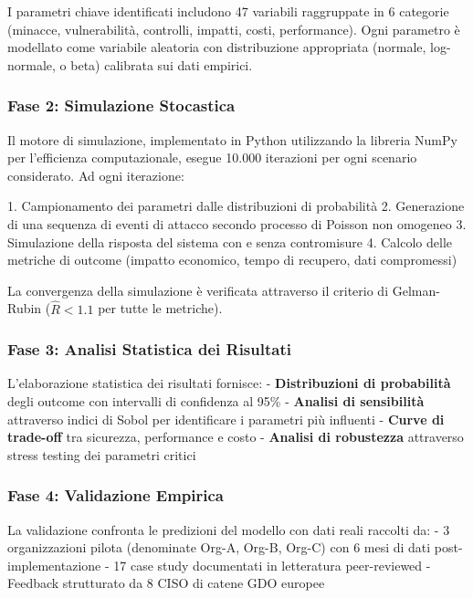 I parametri chiave identificati includono 47 variabili raggruppate in 6 categorie (minacce, vulnerabilità, controlli, impatti, costi, performance). Ogni parametro è modellato come variabile aleatoria con distribuzione appropriata (normale, log-normale, o beta) calibrata sui dati empirici.

\subsubsection{Fase 2: Simulazione Stocastica}

Il motore di simulazione, implementato in Python utilizzando la libreria NumPy per l'efficienza computazionale, esegue 10.000 iterazioni per ogni scenario considerato. Ad ogni iterazione:

1. Campionamento dei parametri dalle distribuzioni di probabilità
2. Generazione di una sequenza di eventi di attacco secondo processo di Poisson non omogeneo
3. Simulazione della risposta del sistema con e senza contromisure
4. Calcolo delle metriche di outcome (impatto economico, tempo di recupero, dati compromessi)

La convergenza della simulazione è verificata attraverso il criterio di Gelman-Rubin ($\hat{R} < 1.1$ per tutte le metriche).

\subsubsection{Fase 3: Analisi Statistica dei Risultati}

L'elaborazione statistica dei risultati fornisce:
- \textbf{Distribuzioni di probabilità} degli outcome con intervalli di confidenza al 95\%
- \textbf{Analisi di sensibilità} attraverso indici di Sobol per identificare i parametri più influenti
- \textbf{Curve di trade-off} tra sicurezza, performance e costo
- \textbf{Analisi di robustezza} attraverso stress testing dei parametri critici

\subsubsection{Fase 4: Validazione Empirica}

La validazione confronta le predizioni del modello con dati reali raccolti da:
- 3 organizzazioni pilota (denominate Org-A, Org-B, Org-C) con 6 mesi di dati post-implementazione
- 17 case study documentati in letteratura peer-reviewed
- Feedback strutturato da 8 CISO di catene GDO europee

